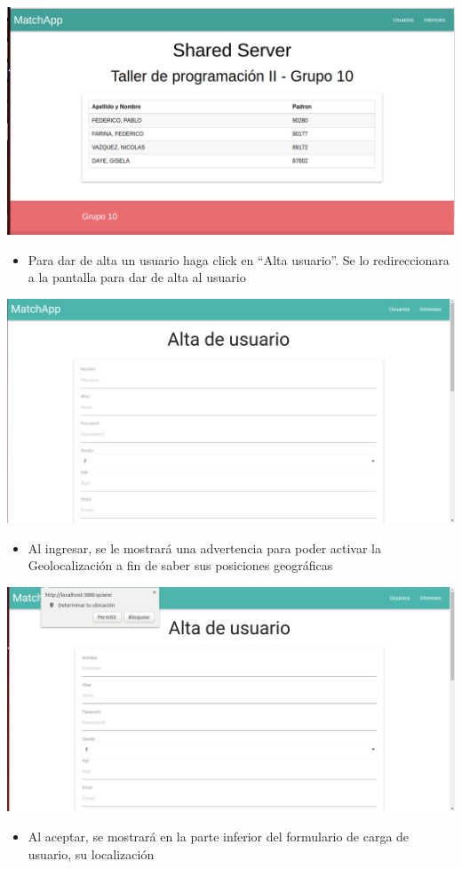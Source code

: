 \documentclass[letterpaper,10pt,english]{sphinxmanual}
\begin{document}
\includegraphics{shared_portada.png}
\begin{itemize}
\item {} 
Para dar de alta un usuario haga click en “Alta usuario”. Se lo redireccionara a la pantalla para dar de alta al usuario

\end{itemize}

\includegraphics{shared_altaUsuario.png}
\begin{itemize}
\item {} 
Al ingresar, se le mostrará una advertencia para poder activar la Geolocalización a fin de saber sus posiciones geográficas

\end{itemize}

\includegraphics{shared_localizacion.png}
\begin{itemize}
\item {} 
Al aceptar, se mostrará en la parte inferior del formulario de carga de usuario, su localización

\end{itemize}
\end{document}

